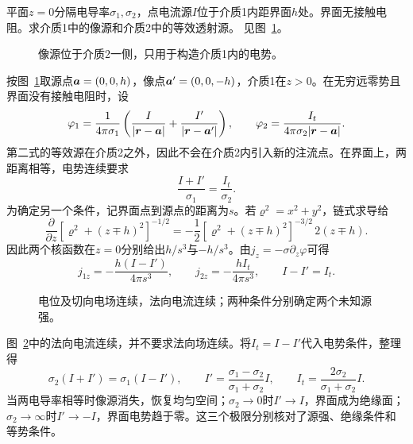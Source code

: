 \begin{example}[两导电半空间的像源系数]\label{ex:c1-interface-image}
平面$z=0$分隔电导率$\sigma_1,\sigma_2$，点电流源$I$位于介质1内距界面$h$处。界面无接触电阻。求介质1中的像源和介质2中的等效透射源。 见图~\ref{fig:c1-interface-image-q}。
\end{example}

\begin{figure}[H]\centering
{}
\caption{像源位于介质2一侧，只用于构造介质1内的电势。}\label{fig:c1-interface-image-q}
\end{figure}
\begin{solution}
按图~\ref{fig:c1-interface-image-q}取源点$\bm{a}=(0,0,h)$，像点$\bm{a}'=(0,0,-h)$，介质1在$z>0$。在无穷远零势且界面没有接触电阻时，设
\[
 \varphi_1=\frac1{4\pi\sigma_1}\left(\frac I{|\bm{r}-\bm{a}|}+\frac{I'}{|\bm{r}-\bm{a}'|}\right),\qquad
 \varphi_2=\frac{I_t}{4\pi\sigma_2|\bm{r}-\bm{a}|}.
\]
第二式的等效源在介质2之外，因此不会在介质2内引入新的注流点。在界面上，两距离相等，电势连续要求
\[
 \frac{I+I'}{\sigma_1}=\frac{I_t}{\sigma_2}.
\]
为确定另一个条件，记界面点到源点的距离为$s$。若$\varrho^2=x^2+y^2$，链式求导给
\[
 \frac{\partial}{\partial z}[\varrho^2+(z\mp h)^2]^{-1/2}
 =-\frac12[\varrho^2+(z\mp h)^2]^{-3/2}\,2(z\mp h).
\]
因此两个核函数在$z=0$分别给出$h/s^3$与$-h/s^3$。由$j_z=-\sigma\partial_z\varphi$可得
\[
 j_{1z}=-\frac{h(I-I')}{4\pi s^3},\qquad
 j_{2z}=-\frac{hI_t}{4\pi s^3},\qquad I-I'=I_t.
\]
\begin{figure}[H]\centering
{}
\caption{电位及切向电场连续，法向电流连续；两种条件分别确定两个未知源强。}\label{fig:c1-interface-image-s}
\end{figure}
图~\ref{fig:c1-interface-image-s}中的法向电流连续，并不要求法向场连续。将$I_t=I-I'$代入电势条件，整理得
\[
 \sigma_2(I+I')=\sigma_1(I-I'),\qquad
 \boxed{I'=\frac{\sigma_1-\sigma_2}{\sigma_1+\sigma_2}I},\qquad
 \boxed{I_t=\frac{2\sigma_2}{\sigma_1+\sigma_2}I}.
\]
当两电导率相等时像源消失，恢复均匀空间；$\sigma_2\to0$时$I'\to I$，界面成为绝缘面；$\sigma_2\to\infty$时$I'\to-I$，界面电势趋于零。这三个极限分别核对了源强、绝缘条件和等势条件。
\end{solution}



